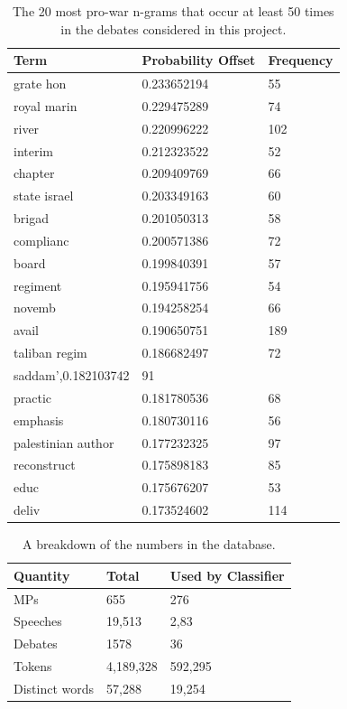 \documentclass[12pt,a4paper,twoside,openright]{report}
\begin{document}
\begin{table}[]
	\centering
	\begin{tabular}{lll}
		\hline
		\textbf{Term} & \textbf{Probability Offset} & \textbf{Frequency} \\ \hline
		grate hon&0.233652194&55\\
		royal marin&0.229475289&74\\
		river&0.220996222&102\\
		interim&0.212323522&52\\
		chapter&0.209409769&66\\
		state israel&0.203349163&60\\
		brigad&0.201050313&58\\
		complianc&0.200571386&72\\
		board&0.199840391&57\\
		regiment&0.195941756&54\\
		novemb&0.194258254&66\\
		avail&0.190650751&189\\
		taliban regim&0.186682497&72\\
		saddam',0.182103742&91\\
		practic&0.181780536&68\\
		emphasis&0.180730116&56\\
		palestinian author&0.177232325&97\\
		reconstruct&0.175898183&85\\
		educ&0.175676207&53\\
		deliv&0.173524602&114\\ \hline
	\end{tabular}
	\caption{The 20 most pro-war n-grams that occur at least 50 times in the debates considered in this project.}
	\label{table:pro-grams}	
\end{table}
\begin{table}[]
	\centering
	\begin{tabular}{lll}
		\hline
		\textbf{Quantity} & \textbf{Total} & \textbf{Used by Classifier} \\ \hline
		MPs               & 655            & 276                         \\
		Speeches          & 19,513         & 2,83                        \\
		Debates           & 1578           & 36                          \\ 
		Tokens            & 4,189,328      & 592,295                     \\
		Distinct words    & 57,288         & 19,254                      \\ \hline
	\end{tabular}
	\caption{A breakdown of the numbers in the database.}
	\label{table:databasestats}	
\end{table}
\end{document}
